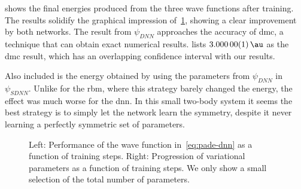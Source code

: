 \documentclass[Thesis.tex]{subfiles}
\begin{document}
 shows the final energies produced from the
three wave functions after training. The results solidify the graphical
impression of~\cref{fig:QD-pade-dnn-training}, showing a clear improvement by
both networks. The result from $\psi_{DNN}$ approaches the accuracy of \gls{dmc},
a technique that can obtain exact numerical results. \textcite{Pedersen-2011}
lists $\SI{3.00000(1)}{\au}$ as the \gls{dmc} result, which has an overlapping
confidence interval with our results.

Also included is the energy obtained by using the parameters from $\psi_{DNN}$
in $\psi_{SDNN}$. Unlike for the \gls{rbm}, where this strategy barely changed the
energy, the effect was much worse for the \gls{dnn}. In this small two-body
system it seems the best strategy is to simply let the network learn the
symmetry, despite it never learning a perfectly symmetric set of parameters.

\begin{figure}[h]
   \centering
    \resizebox{\linewidth}{!}{%
        
    }
    \caption[Learning progression of a neural network on quantum dots]{\label{fig:QD-pade-dnn-training}Left: Performance of the wave
function in~\cref{eq:pade-dnn} as a function of training steps. Right:
Progression of variational parameters as a function of training steps. We only
show a small selection of the total number of parameters.}
\end{figure}

\begin{table}[h]
  \centering

  \caption[Energy estimates using a neural network on quantum
  dots]{\label{tab:pade-dnn-energy-results}Energy using the neural networks
$\psi_{DNN}$ and $\psi_{SDNN}$, along with the benchmark wave function after the
same amount of optimization. $\hat\psi_{SDNN}$ shows the result of using the
parameters from $\psi_{DNN}$ with input sorting applied only after training.
Results obtained from $2^{22}$ samples and errors corrected for autocovariance by blocking. Energies in atomic units
$[\si{\au}]$. See \cref{fig:QD-pade-dnn-training} for source code reference.}
  
\end{table}

%         
\end{document}
